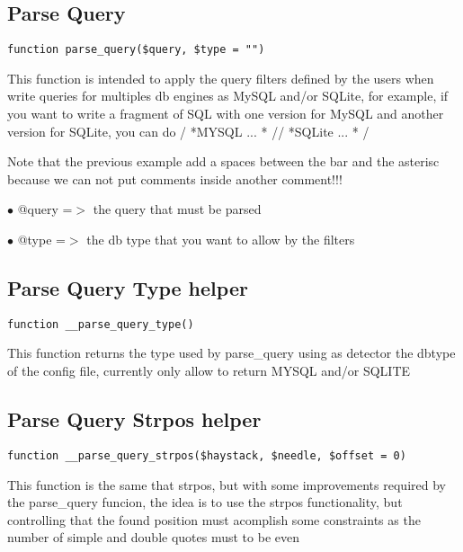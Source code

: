 \documentclass[a4paper]{book}
\begin{document}
\hypertarget{toc226}{}
\subsection{Parse Query}

\begin{lstlisting}
function parse_query($query, $type = "")
\end{lstlisting}

This function is intended to apply the query filters defined by the users
when write queries for multiples db engines as MySQL and/or SQLite, for
example, if you want to write a fragment of SQL with one version for MySQL
and another version for SQLite, you can do / *MYSQL ... * // *SQLite ... * /

Note that the previous example add a spaces between the bar and the asterisc
because we can not put comments inside another comment!!!

\begin{compactitem}
\item[\color{myblue}$\bullet$] @query =$>$ the query that must be parsed
\item[\color{myblue}$\bullet$] @type  =$>$ the db type that you want to allow by the filters
\end{compactitem}

\hypertarget{toc227}{}
\subsection{Parse Query Type helper}

\begin{lstlisting}
function __parse_query_type()
\end{lstlisting}

This function returns the type used by parse\_query using as detector the
dbtype of the config file, currently only allow to return MYSQL and/or SQLITE

\hypertarget{toc228}{}
\subsection{Parse Query Strpos helper}

\begin{lstlisting}
function __parse_query_strpos($haystack, $needle, $offset = 0)
\end{lstlisting}

This function is the same that strpos, but with some improvements required
by the parse\_query funcion, the idea is to use the strpos functionality, but
controlling that the found position must acomplish some constraints as the
number of simple and double quotes must to be even
\end{document}
